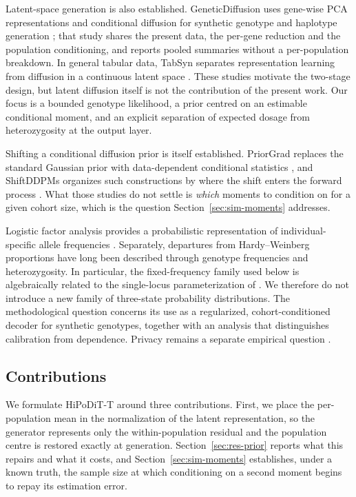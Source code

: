 \documentclass[11pt,a4paper]{article}
\begin{document}
Latent-space generation is also established. GeneticDiffusion uses gene-wise
PCA representations and conditional diffusion for synthetic genotype and
haplotype generation \citep{Kenneweg2025}; that study shares the present data,
the per-gene reduction and the population conditioning, and reports pooled
summaries without a per-population breakdown. In general tabular data, TabSyn
separates representation learning from diffusion in a continuous latent space
\citep{Zhang2024}. These studies motivate the two-stage design, but latent
diffusion itself is not the contribution of the present work. Our focus is a
bounded genotype likelihood, a prior centred on an estimable conditional
moment, and an explicit separation of expected dosage from heterozygosity at
the output layer.

Shifting a conditional diffusion prior is itself established. PriorGrad
replaces the standard Gaussian prior with data-dependent conditional statistics
\citep{Lee2022}, and ShiftDDPMs organizes such constructions by where the shift
enters the forward process \citep{Li2023}. What those studies do not settle is
\emph{which} moments to condition on for a given cohort size, which is the
question Section~\ref{sec:sim-moments} addresses.

Logistic factor analysis provides a probabilistic representation of
individual-specific allele frequencies \citep{Hao2016}. Separately, departures
from Hardy--Weinberg proportions have long been described through genotype
frequencies and heterozygosity. In particular, the fixed-frequency family used
below is algebraically related to the single-locus parameterization of
\citet{Lachance2009}. We therefore do not introduce a new family of
three-state probability distributions. The methodological question concerns
its use as a regularized, cohort-conditioned decoder for synthetic genotypes,
together with an analysis that distinguishes calibration from dependence.
Privacy remains a separate empirical question \citep{Oprisanu2022}.

\subsection{Contributions}
\label{sec:contrib}

We formulate HiPoDiT-T around three contributions. First, we place the
per-population mean in the normalization of the latent representation, so the
generator represents only the within-population residual and the population
centre is restored exactly at generation. Section~\ref{sec:res-prior} reports
what this repairs and what it costs, and Section~\ref{sec:sim-moments}
establishes, under a known truth, the sample size at which conditioning on a
second moment begins to repay its estimation error.
\end{document}
